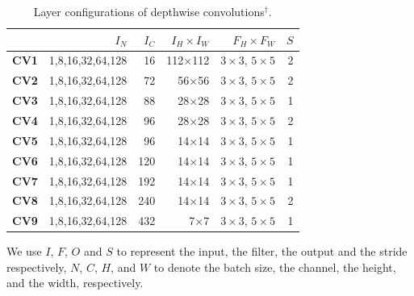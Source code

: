 \begin{table}[]
\caption{Layer configurations of depthwise  convolutions$^{\dag}$.}
\label{tab:depconvconfigs}
\centering
{}
\begin{threeparttable}
\begin{tabular}{lrrrrr}
\toprule
& \textbf{$I_N$} & \textbf{$I_C$} & \textbf{$I_H \times I_W$ }&  \textbf{$F_H \times F_W$} &\textbf{$S$}\\
\midrule
\textbf{CV1} & 1,8,16,32,64,128  & 16    & 112$\times$112 & $3 \times 3$, $5 \times 5$&2  \\
\textbf{CV2} & 1,8,16,32,64,128  & 72    & 56$\times$56  &$3 \times 3$, $5 \times 5$  &2 \\
\textbf{CV3} & 1,8,16,32,64,128  & 88   & 28$\times$28  &$3 \times 3$, $5 \times 5$   &1 \\
\textbf{CV4} & 1,8,16,32,64,128  & 96    & 28$\times$28  &$3 \times 3$, $5 \times 5$  &2  \\
\textbf{CV5} & 1,8,16,32,64,128  & 96   & 14$\times$14  &$3 \times 3$, $5 \times 5$   &1 \\
\textbf{CV6} & 1,8,16,32,64,128  & 120   & 14$\times$14  &$3 \times 3$, $5 \times 5$  &1  \\
\textbf{CV7} & 1,8,16,32,64,128  & 192   & 14$\times$14  &$3 \times 3$, $5 \times 5$  &1  \\
\textbf{CV8} & 1,8,16,32,64,128  & 240   & 14$\times$14  &$3 \times 3$, $5 \times 5$  &2  \\
\textbf{CV9} & 1,8,16,32,64,128  & 432   & 7$\times$7  &$3 \times 3$, $5 \times 5$    &1\\

\bottomrule
\end{tabular}
\footnotesize
\begin{tablenotes}
\item[\dag] We use $I$, $F$, $O$ and $S$ to represent the input, the filter, the output and the stride respectively, $N$, $C$, $H$, and $W$
to denote the batch size, the channel, the height, and the width, respectively.
\end{tablenotes}
\end{threeparttable}
\vspace{-5mm}
\end{table}

